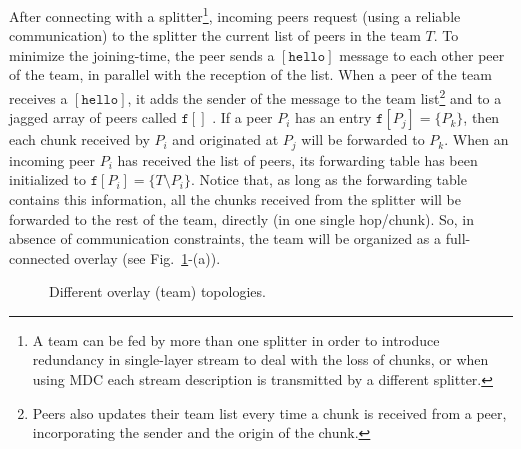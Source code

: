 

\label{sec:joining}

After connecting with a splitter\footnote{A team can be fed by more
  than one splitter in order to introduce redundancy in single-layer
  stream to deal with the loss of chunks, or when using MDC each
  stream description is transmitted by a different splitter.},
incoming peers request (using a reliable communication) to the
splitter the current list of peers in the team $T$. To minimize the
\gls{joining-time}, the peer sends a $[\mathtt{hello}]$ message to
each other peer of the team, in parallel with the reception of the
list. When a peer of the team receives a $[\mathtt{hello}]$, it adds
the sender of the message to the team list\footnote{Peers also updates
  their team list every time a chunk is received from a peer,
  incorporating the sender and the origin of the chunk.} and to a
jagged array of peers called $\mathtt{f}[]$ . If a peer $P_i$ has an entry
$\mathtt{f}[P_j]=\{P_k\}$, then each chunk received by $P_i$ and
originated at $P_j$ will be forwarded to $P_k$. When an incoming peer
$P_i$ has received the list of peers, its forwarding table has been
initialized to $\mathtt{f}[P_i]=\{T\setminus P_i\}$. Notice that, as
long as the forwarding table contains this information, all the chunks
received from the splitter will be forwarded to the rest of the team,
directly (in one single hop/chunk). So, in absence of communication
constraints, the team will be organized as a full-connected overlay
(see Fig.~\ref{fig:three_topos}-(a)).

\begin{figure}
  \centering
  \caption{Different overlay (team) topologies.}
  \label{fig:three_topos}
\end{figure}%
  


